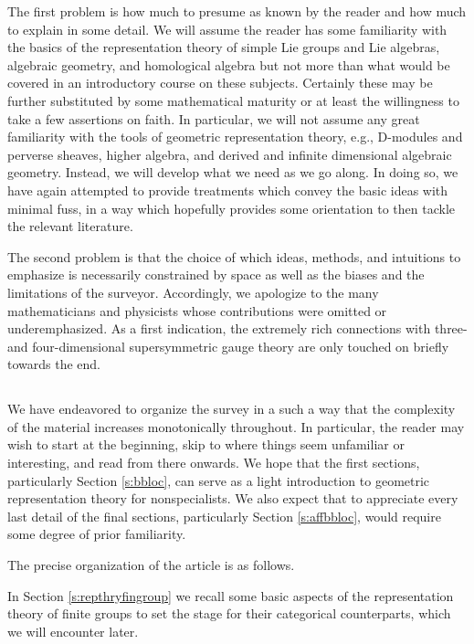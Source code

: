 \documentclass[10pt]{amsart}
\theoremstyle{remark}
\numberwithin{equation}{section}
\begin{document}
     The first problem is how much to presume as known by the 
	reader and how much to explain in some detail. We will assume the reader 
	has some 
	familiarity with the basics of the representation theory of simple Lie groups 
	and Lie algebras, algebraic geometry, and homological algebra but not more 
	than what would be covered in an introductory course on these subjects. 
	Certainly these may be further substituted by some mathematical maturity 
	or at least the willingness to take a 
	few assertions on faith.  In particular, we will not assume any great 
	familiarity with the tools of geometric representation theory, 
	e.g., D-modules and perverse sheaves, higher algebra, and derived and 
	infinite 
	dimensional algebraic geometry. Instead, we will develop what we need as we 
	go along. In doing so, we have again attempted to provide treatments which 
	convey the basic ideas with minimal fuss, in a way which hopefully provides some 
	orientation to then tackle the relevant literature. 
	
		The second problem is that the choice of which ideas, methods, 
and 
	intuitions to emphasize is necessarily constrained by space as well as the 
	biases and the 
	limitations of the surveyor. Accordingly, we apologize to the many 
	mathematicians and physicists whose contributions were omitted 
	or underemphasized. As a first indication, the extremely rich connections 
	with three- 
	and four-dimensional supersymmetric gauge theory are only touched on 
	briefly towards the end. 
	
	
	
	
	
	\subsection{} We have endeavored to organize the survey in a such a way 
	that the complexity of the material increases monotonically throughout. In 
	particular, the reader may wish to start at the beginning, skip to where 
	things seem unfamiliar or interesting, and read from there onwards. We hope 
	that the first sections, particularly Section \ref{s:bbloc}, can serve as a 
	light introduction to geometric representation theory for nonspecialists. 
	We also expect that to appreciate every last detail of the final sections, 
	particularly 
	Section \ref{s:affbbloc}, would require some degree of prior familiarity.  

	
	The precise organization of the article is as follows. 
	
	In Section \ref{s:repthryfingroup} we recall some basic aspects of the 
	representation theory of finite groups to set the stage for their 
	categorical counterparts, which we will encounter later. 
	
\end{document}

